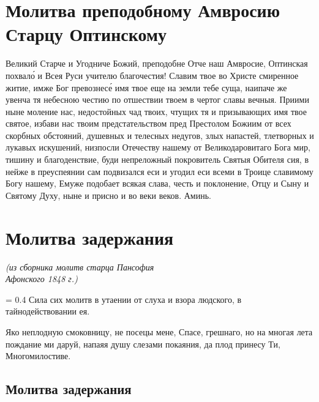 \documentclass[12pt,twoside,xdvi,a6paper,civil=times]{hipbook}
\renewcommand{\*}{\raise3pt\hbox{\footnotesize*}}
\begin{document}
\civil

\section[\civil Молитва прп. Амвросию Оптинскому]
{Молитва преподобному Амвросию Старцу Оптинскому}

Великий Старче и Угодниче Божий, преподобне Отче наш Амвросие, Оптинская
похвал\'о и Всея Руси учителю благочестия! Славим твое во Христе смиренное
житие, имже Бог превознес\'е имя твое еще на земли тебе суща, наипаче же увенча
тя небесною честию по отшествии твоем в чертог славы вечныя. Приими ныне
моление нас, недостойных чад твоих, чтущих тя и призывающих имя твое святое,
избави нас твоим предстательством пред Престолом Божиим от всех скорбных
обстояний, душевных и телесных недугов, злых напастей, тлетворных и лукавых
искушений, низпосли Отечеству нашему от Великодаровитаго Бога мир, тишину и
благоденствие, буди непреложный покровитель Святыя Обителя сия, в нейже в
преуспеянии сам подвизался еси и угодил еси всеми в Троице славимому Богу
нашему, Емуже подобает всякая слава, честь и поклонение, Отцу и Сыну и Святому
Духу, ныне и присно и во веки веков. Аминь.

\csendpictsmall
\clearpage

\section[\civil Молитва задержания]{\large Молитва задержания}

\begin{center}
\textit{\footnotesize(из сборника молитв старца Пансофия\\ Афонского 1848 г.)}
\baselineskip
\end{center}

  
\baselineskip
{\footnotesize
\leftskip = 0.4\textwidth
Сила сих молитв в утаении от слуха и взора людского, в тайнодействовании ея.\par}
\baselineskip

Яко неплодную смоковницу, не посецы мене, Спасе, грешнаго, но на многая лета
пождание ми даруй, напаяя душу слезами покаяния, да плод принесу Ти,
Многомилостиве.

\subsection{\bfseries Молитва задержания}
\end{document}
